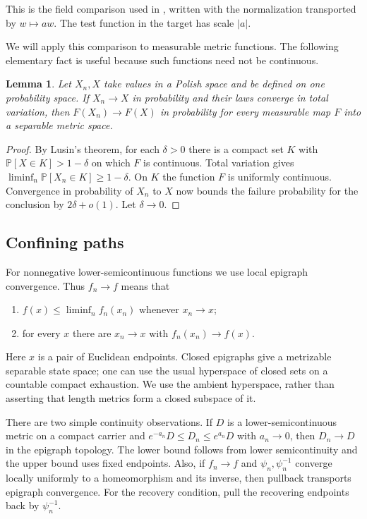 \documentclass[11pt]{article}
\newtheorem{lemma}[theorem]{Lemma}
\theoremstyle{definition}
\theoremstyle{remark}
\newcommand{\Pp}{\mathbb P}
\begin{document}
This is the field comparison used in \cite[Lemma 2.4]{GM}, written
with the normalization transported by $w\mapsto aw$. The test
function in the target has scale $|a|$.

We will apply this comparison to measurable metric functions.
The following elementary fact is useful because such functions
need not be continuous.

\begin{lemma}\label{lem:lusin}
Let $X_n,X$ take values in a Polish space and be defined on one
probability space. If $X_n\to X$ in probability and their laws
converge in total variation, then $F(X_n)\to F(X)$ in probability
for every measurable map $F$ into a separable metric space.
\end{lemma}
\begin{proof}
By Lusin's theorem, for each $\delta>0$ there is a compact set
$K$ with $\Pp[X\in K]>1-\delta$ on which $F$ is continuous.
Total variation gives $\liminf_n\Pp[X_n\in K]\ge1-\delta$.
On $K$ the function $F$ is uniformly continuous. Convergence in
probability of $X_n$ to $X$ now bounds the failure probability
for the conclusion by $2\delta+o(1)$. Let $\delta\to0$.
\end{proof}

\subsection{Confining paths}
For nonnegative lower-semicontinuous functions we use local epigraph
convergence. Thus $f_n\to f$ means that
\begin{enumerate}[label=(\roman*)]
\item $f(x)\le\liminf_n f_n(x_n)$ whenever $x_n\to x$;
\item for every $x$ there are $x_n\to x$ with $f_n(x_n)\to f(x)$.
\end{enumerate}
Here $x$ is a pair of Euclidean endpoints. Closed epigraphs give a
metrizable separable state space; one can use the usual hyperspace
of closed sets on a countable compact exhaustion. We use the
ambient hyperspace, rather than asserting that length metrics
form a closed subspace of it.

There are two simple continuity observations. If $D$ is a
lower-semicontinuous metric on a compact carrier and
$e^{-a_n}D\le D_n\le e^{a_n}D$ with $a_n\to0$, then
$D_n\to D$ in the epigraph topology. The lower bound follows
from lower semicontinuity and the upper bound uses fixed
endpoints. Also, if $f_n\to f$ and $\psi_n,\psi_n^{-1}$ converge
locally uniformly to a homeomorphism and its inverse, then
pullback transports epigraph convergence. For the recovery
condition, pull the recovering endpoints back by $\psi_n^{-1}$.
\end{document}
